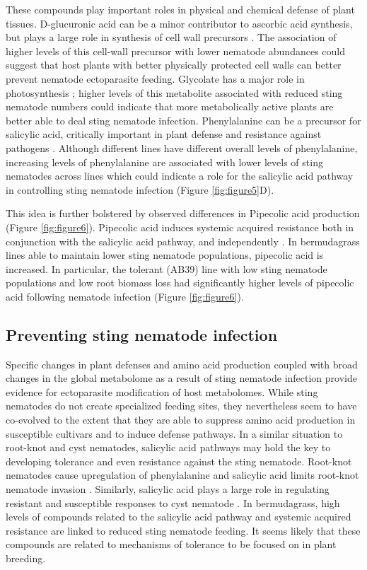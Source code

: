 \documentclass[9pt,lineno]{elife}
\begin{document}
These compounds play important roles in physical and chemical defense of plant tissues.  D-glucuronic acid can be a minor contributor to ascorbic acid synthesis, but plays a large role in synthesis of cell wall precursors \citep{valpuesta2004biosynthesis}.  The association of higher levels of this cell-wall precursor with lower nematode abundances could suggest that host plants with better physically protected cell walls can better prevent nematode ectoparasite feeding. Glycolate has a major role in photosynthesis \citep{tolbert1997c2}; higher levels of this metabolite associated with reduced sting nematode numbers could indicate that more metabolically active plants are better able to deal sting nematode infection.  Phenylalanine can be a precursor for salicylic acid, critically important in plant defense and resistance against pathogens \citep{raskin1992role,delaney1994central,mauch1996production}. Although different lines have different overall levels of phenylalanine, increasing levels of phenylalanine are associated with lower levels of sting nematodes across lines which could indicate a role for the salicylic acid pathway in controlling sting nematode infection (Figure \ref{fig:figure5}D).  

This idea is further bolstered by observed differences in Pipecolic acid production (Figure \ref{fig:figure6}).  Pipecolic acid induces systemic acquired resistance both in conjunction with the salicylic acid pathway, and independently \citep{shan2018pipped,wang2018pipecolic}. In bermudagrass lines able to maintain lower sting nematode populations, pipecolic acid is increased.  In particular, the tolerant (AB39) line with low sting nematode populations and low root biomass loss had significantly higher levels of pipecolic acid following nematode infection (Figure \ref{fig:figure6}).    

\subsection{Preventing sting nematode infection}
Specific changes in plant defenses and amino acid production coupled with broad changes in the global metabolome as a result of sting nematode infection provide evidence for ectoparasite modification of host metabolomes.  While sting nematodes do not create specialized feeding sites, they nevertheless seem to have co-evolved to the extent that they are able to suppress amino acid production in susceptible cultivars and to induce defense pathways.  In a similar situation to root-knot and cyst nematodes, salicylic acid pathways may hold the key to developing tolerance and even resistance against the sting nematode.  Root-knot nematodes cause upregulation of phenylalanine and salicylic acid limits root-knot nematode invasion \citep{eloh2016untargeted}.  Similarly, salicylic acid plays a large role in regulating resistant and susceptible responses to cyst nematode \citep{uehara2010resistant, martinez2017shifting}.  In bermudagrass, high levels of compounds related to the salicylic acid pathway and systemic acquired resistance are linked to reduced sting nematode feeding.  It seems likely that these compounds are related to mechanisms of tolerance to be focused on in plant breeding. 
\end{document}
